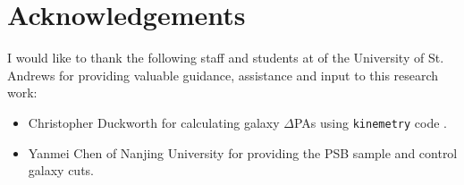 \section*{Acknowledgements} %

I would like to thank the following staff and students at of the University of St. Andrews for providing valuable guidance, assistance and input to this research work:
\begin{itemize}
    \item Christopher Duckworth for calculating galaxy $\Delta$PAs using \texttt{kinemetry} code \citep{2011MNRAS.414.2923K}.
    \item Yanmei Chen of Nanjing University for providing the PSB sample and control galaxy cuts.
\end{itemize}
